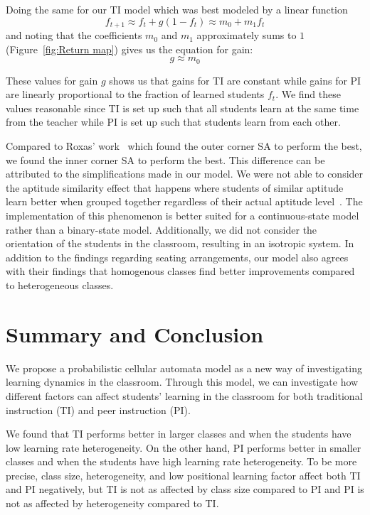 \documentclass[twocolumn,secnumarabic,amssymb, nobibnotes, aps, prd]{revtex4-2}
\begin{document}
        Doing the same for our TI model which was best modeled by a linear function
%
        \begin{equation}
            \label{eq:TI_ft_eq}
            f_{t+1} \approx f_t + g(1-f_t) \approx m_0 + m_1f_t
        \end{equation}
%
        and noting that the coefficients $m_0$ and $m_1$ approximately sums to $1$ (Figure~\ref{fig:Return map}) gives us the equation for gain:
%
       \begin{equation}
            \label{eq:TI_g_eq}
            g \approx m_0
       \end{equation}

       These values for gain $g$ shows us that gains for TI are constant while gains for PI are linearly proportional to the fraction of learned students $f_t$.
       We find these values reasonable since TI is set up such that all students learn at the same time from the teacher while PI is set up such that students learn from each other.

        Compared to Roxas' work~\cite{roxas2010seating} which found the outer corner SA to perform the best, we found the inner corner SA to perform the best.
        This difference can be attributed to the simplifications made in our model.
        We were not able to consider the aptitude similarity effect that happens where students of similar aptitude learn better when grouped together regardless of their actual aptitude level~\cite{smith2009peer}.
        The implementation of this phenomenon is better suited for a continuous-state model rather than a binary-state model.
        Additionally, we did not consider the orientation of the students in the classroom, resulting in an isotropic system.
        In addition to the findings regarding seating arrangements, our model also agrees with their findings that homogenous classes find better improvements compared to heterogeneous classes.
    
\section{Summary and Conclusion}
    We propose a probabilistic cellular automata model as a new way of investigating learning dynamics in the classroom.
    Through this model, we can investigate how different factors can affect students' learning in the classroom for both traditional instruction (TI) and peer instruction (PI).

    We found that TI performs better in larger classes and when the students have low learning rate heterogeneity.
    On the other hand, PI performs better in smaller classes and when the students have high learning rate heterogeneity.
    To be more precise, class size, heterogeneity, and low positional learning factor affect both TI and PI negatively, but TI is not as affected by class size compared to PI and PI is not as affected by heterogeneity compared to TI.
\end{document}
